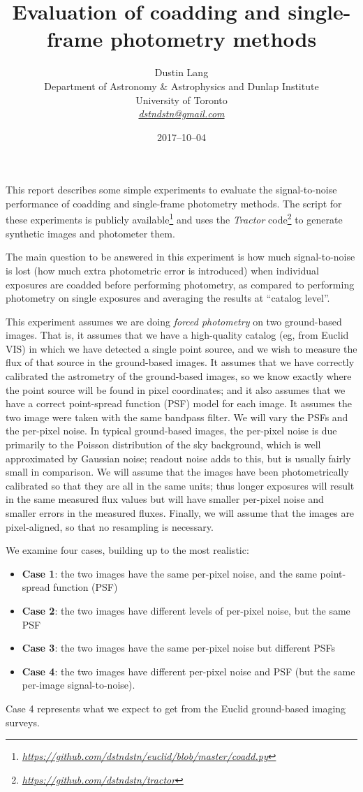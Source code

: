 \documentclass[a4paper,11pt]{article}
\author{Dustin Lang \\
  \small Department of Astronomy \& Astrophysics and Dunlap Institute \\
  \small University of Toronto \\
  \href{mailto:dstndstn@gmail.com}{\small \textsl{dstndstn@gmail.com}}}
\date{2017--10--04}
\title{Evaluation of coadding and single-frame photometry methods}
\newcommand{\niceurl}[1]{\href{#1}{\textsl{#1}}}
\newcommand{\code}[1]{\textsl{#1}}
\begin{document}
\maketitle

This report describes some simple experiments to evaluate the
signal-to-noise performance of coadding and single-frame photometry
methods.  The script for these experiments is publicly
available\footnote{%
  \niceurl{https://github.com/dstndstn/euclid/blob/master/coadd.py}}
and uses the \code{Tractor} code\footnote{%
  \niceurl{https://github.com/dstndstn/tractor}} to generate synthetic images
and photometer them.

The main question to be answered in this experiment is how much
signal-to-noise is lost (how much extra photometric error is introduced) when
individual exposures are coadded before performing photometry, as compared to
performing photometry on single exposures and averaging the results at
``catalog level''.

This experiment assumes we are doing \emph{forced photometry} on two
ground-based images.  That is, it assumes that we have a high-quality
catalog (eg, from Euclid VIS) in which we have detected a single point
source, and we wish to measure the flux of that source in the
ground-based images.  It assumes that we have correctly calibrated the
astrometry of the ground-based images, so we know exactly where the
point source will be found in pixel coordinates; and it also assumes
that we have a correct point-spread function (PSF) model for each
image.  It assumes the two image were taken with the same bandpass
filter.  We will vary the PSFs and the per-pixel noise.  In typical
ground-based images, the per-pixel noise is due primarily to the
Poisson distribution of the sky background, which is well approximated
by Gaussian noise; readout noise adds to this, but is usually fairly
small in comparison.  We will assume that the images have been
photometrically calibrated so that they are all in the same units;
thus longer exposures will result in the same measured flux values but
will have smaller per-pixel noise and smaller errors in the measured
fluxes.  Finally, we will assume that the images are pixel-aligned, so
that no resampling is necessary.

We examine four cases, building up to the most realistic:
\begin{itemize}
\item \textbf{Case 1}: the two images have the same per-pixel noise,
  and the same point-spread function (PSF)
\item \textbf{Case 2}: the two images have different levels of
  per-pixel noise, but the same PSF
\item \textbf{Case 3}: the two images have the same per-pixel noise
  but different PSFs
\item \textbf{Case 4}: the two images have different per-pixel noise
  and PSF (but the same per-image signal-to-noise).
\end{itemize}
Case 4 represents what we expect to get from the Euclid ground-based
imaging surveys.
\end{document}
